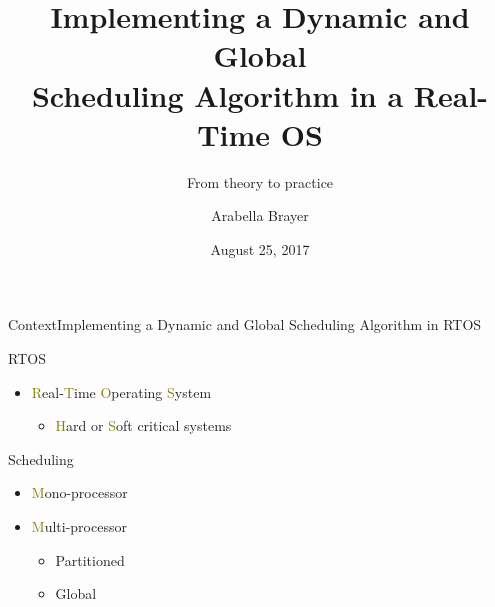 \documentclass[10pt]{beamer}
\title{Implementing a Dynamic and Global\\ Scheduling Algorithm in a Real-Time OS}  %
\subtitle{From theory to practice}
\date{August 25, 2017}
\author{
  Arabella Brayer
}
\institute[
  Computer Science Department
  Université Libre de Bruxelles
] %
{%
  Computer Science Department \\
  Université Libre de Bruxelles \\

  
}
\newcommand{\emphS}[1]{\textcolor{olive}{#1}}
\begin{document}
{\aauwavesbg%
\begin{frame}
  \titlepage
\end{frame}}

\begin{frame}{Context}{Implementing a Dynamic and Global Scheduling Algorithm in RTOS}
  \begin{minipage}{0.6\textwidth}
    \begin{block}
    {RTOS}
      \begin{itemize}
          \item \emphS{R}eal-\emphS{T}ime \emphS{O}perating \emphS{S}ystem
            \begin{itemize}
              [circle]
              \item \emphS{H}ard or \emphS{S}oft critical systems
            \end{itemize}
        \end{itemize}
      \end{block}
      \begin{block}
      {Scheduling}
      \begin{itemize}
          \item \emphS{M}ono-processor
          \item \emphS{M}ulti-processor
          \begin{itemize}
          [circle]
            \item Partitioned
            \item Global
          \end{itemize}
      \end{itemize}
    \end{block}
  \end{minipage}
\end{frame}
\end{document}
